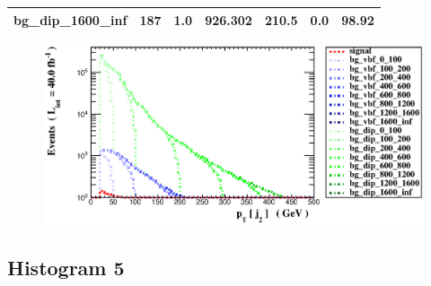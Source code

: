 \documentclass[a4paper, 10pt]{article}
\begin{document}
\begin{table}[H]
\begin{center}
\begin{tabular}{|m{23.0mm}|m{23.0mm}|m{18.0mm}|m{19.0mm}|m{19.0mm}|m{19.0mm}|m{19.0mm}|}
      \hline
      {\cellcolor{white}         bg\_dip\_1600\_inf}& {\cellcolor{white}         187}& {\cellcolor{white}         1.0}& {\cellcolor{white}         926.302}& {\cellcolor{white}         210.5}& {\cellcolor{red}         0.0}& {\cellcolor{red}         98.92}\\
\hline
    \end{tabular}
  \end{center}
\end{table}

\begin{figure}[H]
  \begin{center}
    \includegraphics[scale=0.45]{selection_3.eps}\\
\caption{   }
  \end{center}
\end{figure}
      \newpage
\subsection{ Histogram 5}
\end{document}
